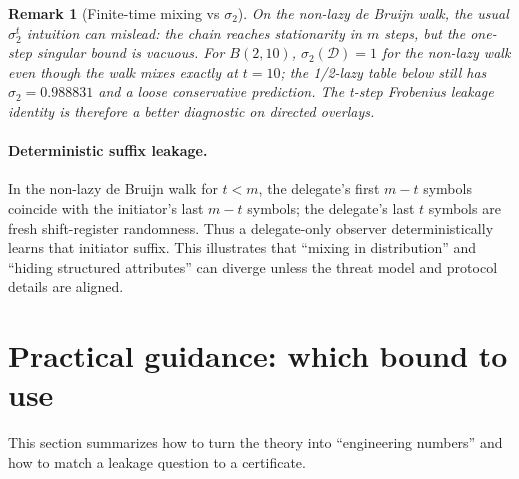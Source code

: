 \documentclass[11pt]{article}
\newtheorem{remark}[theorem]{Remark}
\newcommand{\cD}{\mathcal{D}}
\begin{document}
\begin{remark}[Finite-time mixing vs $\sigma_2$]
On the non-lazy de Bruijn walk, the usual $\sigma_2^t$ intuition can mislead:
the chain reaches stationarity in $m$ steps, but the one-step singular bound is
vacuous.  For $B(2,10)$, $\sigma_2(\cD)=1$ for the non-lazy walk even though the
walk mixes exactly at $t=10$; the 1/2-lazy table below still has
$\sigma_2=0.988831$ and a loose conservative prediction.  The t-step Frobenius
leakage identity is therefore a better diagnostic on directed overlays.
\end{remark}

\paragraph{Deterministic suffix leakage.}
In the non-lazy de Bruijn walk for $t<m$, the delegate's first $m-t$ symbols
coincide with the initiator's last $m-t$ symbols; the delegate's last $t$ symbols
are fresh shift-register randomness.  Thus a delegate-only observer
deterministically learns that initiator suffix.  This illustrates that ``mixing
in distribution'' and ``hiding structured attributes'' can diverge unless the
threat model and protocol details are aligned.


\section{Practical guidance: which bound to use}\label{sec:guidance}
This section summarizes how to turn the theory into ``engineering numbers'' and
how to match a leakage question to a certificate.
\end{document}

